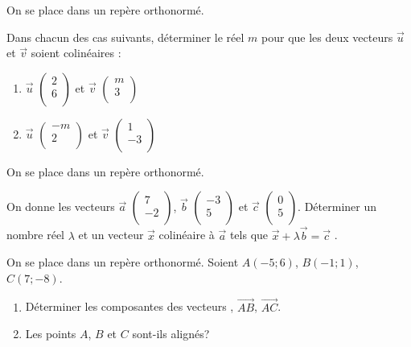 \begin{exercice}
On se place dans un repère orthonormé.

Dans chacun des cas suivants, déterminer le réel $m$ pour que les deux vecteurs $\overrightarrow{u}$ et $\overrightarrow{v}$ soient colinéaires :
\begin{enumerate}
\item $\overrightarrow{u}$ 
$\begin{pmatrix}
2\\ 6\\
\end{pmatrix}$ et $\overrightarrow{v}$ 
$\begin{pmatrix}
m\\ 3\\
\end{pmatrix}$
\item $\overrightarrow{u}$ 
$\begin{pmatrix}
-m\\ 2\\
\end{pmatrix}$ et $\overrightarrow{v}$ 
$\begin{pmatrix}
1\\ -3\\
\end{pmatrix}$
\end{enumerate}
\end{exercice}

\begin{exercice}
On se place dans un repère orthonormé.

On donne les vecteurs $\overrightarrow{a}$ 
$\begin{pmatrix}
7\\ -2\\
\end{pmatrix}$, $\overrightarrow{b}$ 
$\begin{pmatrix}
-3\\ 5\\
\end{pmatrix}$ et  $\overrightarrow{c}$ 
$\begin{pmatrix}
0\\ 5\\
\end{pmatrix}$.
Déterminer un nombre réel $\lambda$ et un vecteur $\overrightarrow{x}$   colinéaire à $\overrightarrow{a}$  tels que $\overrightarrow{x}+\lambda \overrightarrow{b}=\overrightarrow{c}$ .
\end{exercice}

\begin{exercice}
On se place dans un repère orthonormé. Soient $A(-5;6)$, $B(-1;1)$, $C(7;-8)$.\\
\begin{enumerate}
\item Déterminer les composantes des vecteurs , $\overrightarrow{AB}$, $\overrightarrow{AC}$.
\item Les points $A$, $B$ et $C$ sont-ils alignés?
\end{enumerate}
\end{exercice}

